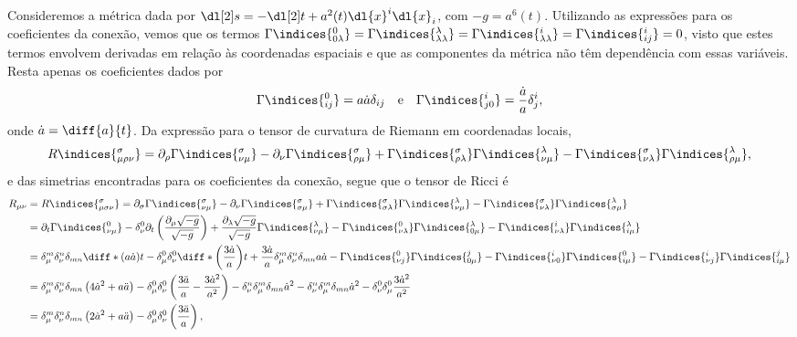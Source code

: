 Consideremos a métrica dada por \(\dl[2]s = -\dl[2]t + a^2(t) \dl{x}^i \dl{x}_i\), com \(-g = a^6(t)\). Utilizando as expressões para os coeficientes da conexão, vemos que os termos \(\Gamma\indices{^0_{0 \lambda}} = \Gamma\indices{^\lambda_{\lambda \lambda}} = \Gamma\indices{^i_{\lambda \lambda}} = \Gamma\indices{^i_{ij}} = 0\), visto que estes termos envolvem derivadas em relação às coordenadas espaciais e que as componentes da métrica não têm dependência com essas variáveis. Resta apenas os coeficientes dados por
\begin{equation*}
    \Gamma\indices{^0_{ij}} = a \dot{a} \delta_{ij}\quad\text{e}\quad
    \Gamma\indices{^i_{j0}} = \frac{\dot{a}}{a} \delta^i_j,
\end{equation*}
onde \(\dot{a} = \diff{a}{t}\). Da expressão para o tensor de curvatura de Riemann em coordenadas locais,
\begin{equation*}
    R\indices{^\sigma_{\mu\rho\nu}} = \partial_\rho\Gamma\indices{^\sigma_{\nu\mu}} - \partial_\nu\Gamma\indices{^\sigma_{\rho\mu}} + \Gamma\indices{^\sigma_{\rho \lambda}} \Gamma\indices{^\lambda_{\nu\mu}} - \Gamma\indices{^\sigma_{\nu \lambda}} \Gamma\indices{^\lambda_{\rho\mu}},
\end{equation*}
e das simetrias encontradas para os coeficientes da conexão, segue que o tensor de Ricci é
\begin{align*}
    R_{\mu\nu} &= R\indices{^\sigma_{\mu\sigma\nu}} = \partial_\sigma\Gamma\indices{^\sigma_{\nu\mu}} - \partial_\nu\Gamma\indices{^\sigma_{\sigma\mu}} + \Gamma\indices{^\sigma_{\sigma \lambda}} \Gamma\indices{^\lambda_{\nu\mu}} - \Gamma\indices{^\sigma_{\nu \lambda}} \Gamma\indices{^\lambda_{\sigma\mu}}\\
               &= \partial_t \Gamma\indices{^0_{\nu\mu}}
               - \delta^0_\nu\partial_t\left(\frac{\partial_\mu\sqrt{-g}}{\sqrt{-g}}\right)
               + \frac{\partial_{\lambda}\sqrt{-g}}{\sqrt{-g}} \Gamma\indices{^\lambda_{\nu\mu}}
               - \Gamma\indices{^0_{\nu \lambda}} \Gamma\indices{^\lambda_{0\mu}}
               - \Gamma\indices{^i_{\nu \lambda}} \Gamma\indices{^\lambda_{i\mu}}\\
               &= \delta^m_\mu\delta^n_\nu \delta_{mn}\diff*{\left(a\dot{a}\right)}{t}
               - \delta^0_\mu\delta^0_\nu\diff*{\left(\frac{3\dot{a}}{a}\right)}{t}
               + \frac{3\dot{a}}{a} \delta^m_\mu \delta^n_\nu \delta_{mn} a\dot{a}
               - \Gamma\indices{^0_{\nu j}} \Gamma\indices{^j_{0\mu}}
               - \Gamma\indices{^i_{\nu 0}} \Gamma\indices{^0_{i\mu}}
               - \Gamma\indices{^i_{\nu j}} \Gamma\indices{^j_{i\mu}}\\
               &= \delta^m_\mu\delta^n_\nu \delta_{mn}\left(4\dot{a}^2 + a\ddot{a}\right)
               - \delta^0_\mu\delta^0_\nu\left(\frac{3\ddot{a}}{a} - \frac{3\dot{a}^2}{a^2}\right)
               - \delta^n_\nu\delta^m_\mu \delta_{mn} \dot{a}^2
               - \delta^n_\nu \delta^m_\mu \delta_{mn} \dot{a}^2
               - \delta^0_\nu\delta^0_\mu \frac{3\dot{a}^2}{a^2}\\
               &= \delta^m_\mu\delta^n_\nu \delta_{mn}\left(2\dot{a}^2 + a\ddot{a}\right)
               - \delta^0_\mu\delta^0_\nu\left(\frac{3\ddot{a}}{a}\right),
\end{align*}
